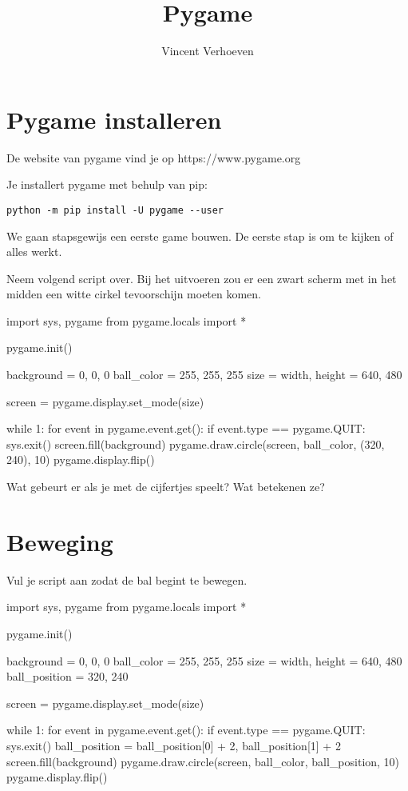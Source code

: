 \documentclass[10pt,a4paper]{article}
\author{Vincent Verhoeven}
\title{Pygame}
\newenvironment{task}{\smallpencil}{}
\begin{document}
\section{Pygame installeren}
De website van pygame vind je op https://www.pygame.org

Je installert pygame met behulp van pip:

\begin{verbatim}
python -m pip install -U pygame --user
\end{verbatim}

We gaan stapsgewijs een eerste game bouwen. De eerste stap is om te kijken of alles werkt.

\begin{task}
Neem volgend script over. Bij het uitvoeren zou er een zwart scherm met in het midden een witte cirkel tevoorschijn moeten komen.
\end{task}

\begin{python}
import sys, pygame
from pygame.locals import *

pygame.init()

background = 0, 0, 0
ball_color = 255, 255, 255
size = width, height = 640, 480

screen = pygame.display.set_mode(size)

while 1:
    for event in pygame.event.get():
        if event.type == pygame.QUIT: sys.exit()
    screen.fill(background)
    pygame.draw.circle(screen, ball_color, (320, 240), 10)
    pygame.display.flip()
\end{python}

\begin{task}
Wat gebeurt er als je met de cijfertjes speelt? Wat betekenen ze?
\end{task}

\newpage
\section{Beweging}

\begin{task}
Vul je script aan zodat de bal begint te bewegen.
\end{task}

\begin{python}
import sys, pygame
from pygame.locals import *

pygame.init()

background = 0, 0, 0
ball_color = 255, 255, 255
size = width, height = 640, 480
ball_position = 320, 240

screen = pygame.display.set_mode(size)

while 1:
    for event in pygame.event.get():
        if event.type == pygame.QUIT: sys.exit()
    ball_position = ball_position[0] + 2, ball_position[1] + 2
    screen.fill(background)
    pygame.draw.circle(screen, ball_color, ball_position, 10)
    pygame.display.flip()
\end{python}
\end{document}
